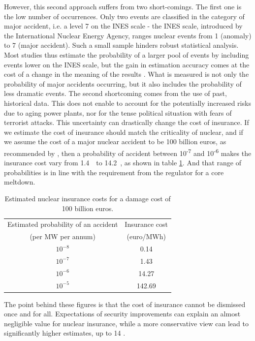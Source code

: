 However, this second approach suffers from two short-comings. The first one is the low number of occurrences. Only two events are classified in the category of major accident, i.e. a level 7 on the INES scale - the INES scale, introduced by the International Nuclear Energy Agency, ranges nuclear events from 1 (anomaly) to 7 (major accident). Such a small sample hinders robust statistical analysis. Most studies thus estimate the probability of a larger pool of events by including events lower on the INES scale, but the gain in estimation accuracy comes at the cost of a change in the meaning of the results \citep{Rangel2014}. What is measured is not only the probability of major accidents occurring, but it also includes the probability of less dramatic events. 
The second shortcoming comes from the use of past, historical data. This does not enable to account for the potentially increased risks due to aging power plants, nor for the tense political situation with fears of terrorist attacks. 
This uncertainty can drastically change the cost of insurance. If we estimate the cost of insurance should match the criticality of nuclear, and if we assume the cost of a major nuclear accident to be 100 billion euros, as recommended by \citet{CourdesComptes2012}, then a probability of accident between 10\textsuperscript{-7} and 10\textsuperscript{-6} makes the insurance cost vary from 1.4~\emwh\ to 14.2~\emwh, as shown in table \ref{tab:insurance}. 
And that range of probabilities is in line with the requirement from the regulator for a core meltdown.

\begin{table}[!h]
	\centering
	\caption{Estimated nuclear insurance costs for a damage cost of 100 billion euros.}
	\label{tab:insurance}
	\begin{tabular}{cc}
		\toprule
		Estimated probability of an accident & Insurance cost \\
		(per MW per annum) & (euro/MWh) \\
		\midrule
		$10^{-8}$  & 0.14 \\
		$10^{-7}$  & 1.43 \\
		$10^{-6}$  & 14.27 \\
		$10^{-5}$  & 142.69 \\
		\bottomrule
	\end{tabular}  
\end{table}

The point behind these figures is that the cost of insurance cannot be dismissed once and for all. Expectations of security improvements can explain an almost negligible value for nuclear insurance, while a more conservative view can lead to significantly higher estimates, up to 14 \emwh. 



